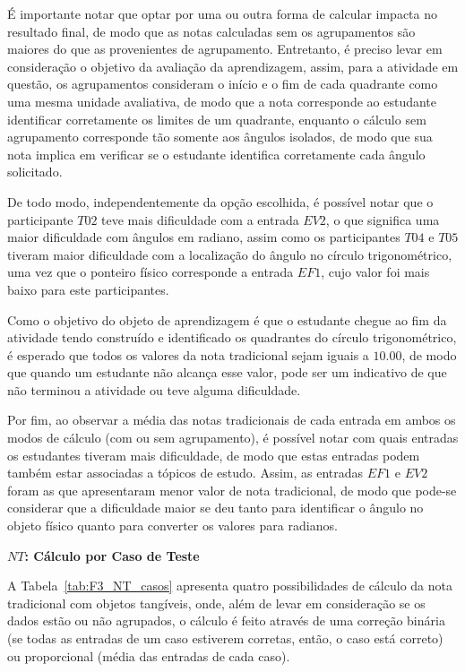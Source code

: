 É importante notar que optar por uma ou outra forma de calcular impacta no resultado final, de modo que as notas calculadas sem os agrupamentos são maiores do que as provenientes de agrupamento. Entretanto, é preciso levar em consideração o objetivo da avaliação da aprendizagem, assim, para a atividade em questão, os agrupamentos consideram o início e o fim de cada quadrante como uma mesma unidade avaliativa, de modo que a nota corresponde ao estudante identificar corretamente os limites de um quadrante, enquanto o cálculo sem agrupamento corresponde tão somente aos ângulos isolados, de modo que sua nota implica em verificar se o estudante identifica corretamente cada ângulo solicitado.

De todo modo, independentemente da opção escolhida, é possível notar que o participante $T02$ teve mais dificuldade com a entrada $EV2$, o que significa uma maior dificuldade com ângulos em radiano, assim como os participantes $T04$ e $T05$ tiveram maior dificuldade com a localização do ângulo no círculo trigonométrico, uma vez que o ponteiro físico corresponde a entrada $EF1$, cujo valor foi mais baixo para este participantes. 

Como o objetivo do objeto de aprendizagem é que o estudante chegue ao fim da atividade tendo construído e identificado os quadrantes do círculo trigonométrico, é esperado que todos os valores da nota tradicional sejam iguais a $10.00$, de modo que quando um estudante não alcança esse valor, pode ser um indicativo de que não terminou a atividade ou teve alguma dificuldade. 

Por fim, ao observar a média das notas tradicionais de cada entrada em ambos os modos de cálculo (com ou sem agrupamento), é possível notar com quais entradas os estudantes tiveram mais dificuldade, de modo que estas entradas podem também estar associadas a tópicos de estudo. Assim, as entradas $EF1$ e $EV2$ foram as que apresentaram menor valor de nota tradicional, de modo que pode-se considerar que a dificuldade maior se deu tanto para identificar o ângulo no objeto físico quanto para converter os valores para radianos.

\textbf{$NT$: Cálculo por Caso de Teste}

A Tabela~\ref{tab:F3_NT_casos} apresenta quatro possibilidades de cálculo da nota tradicional com objetos tangíveis, onde, além de levar em consideração se os dados estão ou não agrupados, o cálculo é feito através de uma correção binária (se todas as entradas de um caso estiverem corretas, então, o caso está correto) ou proporcional (média das entradas de cada caso).

